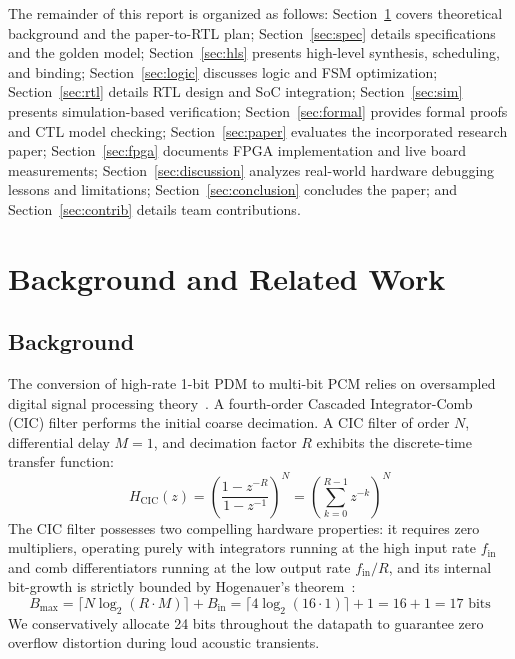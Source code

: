 \documentclass[11pt,a4paper]{article}
\begin{document}
The remainder of this report is organized as follows: Section~\ref{sec:related} covers theoretical background and the paper-to-RTL plan; Section~\ref{sec:spec} details specifications and the golden model; Section~\ref{sec:hls} presents high-level synthesis, scheduling, and binding; Section~\ref{sec:logic} discusses logic and FSM optimization; Section~\ref{sec:rtl} details RTL design and SoC integration; Section~\ref{sec:sim} presents simulation-based verification; Section~\ref{sec:formal} provides formal proofs and CTL model checking; Section~\ref{sec:paper} evaluates the incorporated research paper; Section~\ref{sec:fpga} documents FPGA implementation and live board measurements; Section~\ref{sec:discussion} analyzes real-world hardware debugging lessons and limitations; Section~\ref{sec:conclusion} concludes the paper; and Section~\ref{sec:contrib} details team contributions.

\section{Background and Related Work}
\label{sec:related}

\subsection{Background}
The conversion of high-rate 1-bit PDM to multi-bit PCM relies on oversampled digital signal processing theory~\cite{hogenauer1981,dolecek2009}. A fourth-order Cascaded Integrator-Comb (CIC) filter performs the initial coarse decimation. A CIC filter of order $N$, differential delay $M=1$, and decimation factor $R$ exhibits the discrete-time transfer function:
\begin{equation}
  H_{\text{CIC}}(z) = \left( \frac{1 - z^{-R}}{1 - z^{-1}} \right)^N = \left( \sum_{k=0}^{R-1} z^{-k} \right)^N
  \label{eq:cic_tf}
\end{equation}
The CIC filter possesses two compelling hardware properties: it requires zero multipliers, operating purely with integrators running at the high input rate $f_{\text{in}}$ and comb differentiators running at the low output rate $f_{\text{in}}/R$, and its internal bit-growth is strictly bounded by Hogenauer's theorem~\cite{hogenauer1981}:
\begin{equation}
  B_{\text{max}} = \lceil N \log_2(R \cdot M) \rceil + B_{\text{in}} = \lceil 4 \log_2(16 \cdot 1) \rceil + 1 = 16 + 1 = 17\text{ bits}
  \label{eq:hogenauer}
\end{equation}
We conservatively allocate 24 bits throughout the datapath to guarantee zero overflow distortion during loud acoustic transients.
\end{document}
